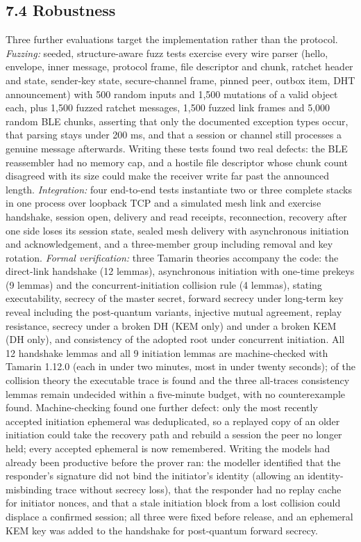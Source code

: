\documentclass[conference]{IEEEtran}
\begin{document}
\subsection{7.4 Robustness}
Three further evaluations target the implementation rather than the protocol. \emph{Fuzzing:} seeded, structure-aware fuzz tests exercise every wire parser (hello, envelope, inner message, protocol frame, file descriptor and chunk, ratchet header and state, sender-key state, secure-channel frame, pinned peer, outbox item, DHT announcement) with 500 random inputs and 1,500 mutations of a valid object each, plus 1,500 fuzzed ratchet messages, 1,500 fuzzed link frames and 5,000 random BLE chunks, asserting that only the documented exception types occur, that parsing stays under 200 ms, and that a session or channel still processes a genuine message afterwards. Writing these tests found two real defects: the BLE reassembler had no memory cap, and a hostile file descriptor whose chunk count disagreed with its size could make the receiver write far past the announced length. \emph{Integration:} four end-to-end tests instantiate two or three complete stacks in one process over loopback TCP and a simulated mesh link and exercise handshake, session open, delivery and read receipts, reconnection, recovery after one side loses its session state, sealed mesh delivery with asynchronous initiation and acknowledgement, and a three-member group including removal and key rotation. \emph{Formal verification:} three Tamarin \cite{ref28} theories accompany the code: the direct-link handshake (12 lemmas), asynchronous initiation with one-time prekeys (9 lemmas) and the concurrent-initiation collision rule (4 lemmas), stating executability, secrecy of the master secret, forward secrecy under long-term key reveal including the post-quantum variants, injective mutual agreement, replay resistance, secrecy under a broken DH (KEM only) and under a broken KEM (DH only), and consistency of the adopted root under concurrent initiation. All 12 handshake lemmas and all 9 initiation lemmas are machine-checked with Tamarin 1.12.0 (each in under two minutes, most in under twenty seconds); of the collision theory the executable trace is found and the three all-traces consistency lemmas remain undecided within a five-minute budget, with no counterexample found. Machine-checking found one further defect: only the most recently accepted initiation ephemeral was deduplicated, so a replayed copy of an older initiation could take the recovery path and rebuild a session the peer no longer held; every accepted ephemeral is now remembered. Writing the models had already been productive before the prover ran: the modeller identified that the responder's signature did not bind the initiator's identity (allowing an identity-misbinding trace without secrecy loss), that the responder had no replay cache for initiator nonces, and that a stale initiation block from a lost collision could displace a confirmed session; all three were fixed before release, and an ephemeral KEM key was added to the handshake for post-quantum forward secrecy.
\end{document}
